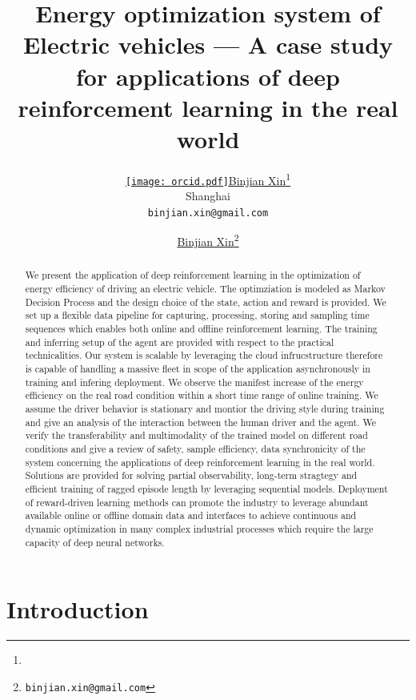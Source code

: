 \documentclass{article}
\title{Energy optimization system of Electric vehicles --- A case study for applications of deep reinforcement learning in the real world}
\author{ \href{https://orcid.org/0009-0003-0705-2612}{\texttt{[image: orcid.pdf]}\hspace{1mm}Binjian Xin}\thanks{} \\
	Shanghai\\
	\texttt{binjian.xin@gmail.com} \\
}
\author[1]{%
	\href{https://orcid.org/0009-0003-0705-2612}{\usebox{\orcid}\hspace{1mm}Binjian Xin\thanks{\texttt{binjian.xin@gmail.com}}}%
}
\affil[1]{}
\begin{document}
\maketitle

\begin{abstract}
	We present the application of deep reinforcement learning in the optimization of energy efficiency of driving an electric vehicle. The optimziation is modeled as Markov Decision Process and the design choice of the state, action and reward is provided. We set up a flexible data pipeline for capturing, processing, storing and sampling time sequences which enables both online and offline reinforcement learning. The training and inferring setup of the agent are provided with respect to the practical technicalities. Our system is scalable by leveraging the cloud infrucstructure therefore is capable of handling a massive fleet in scope of the application asynchronously in training and infering deployment. We observe the manifest increase of the energy efficiency on the real road condition within a short time range of online training. We assume the driver behavior is stationary and montior the driving style during training and give an analysis of the interaction between the human driver and the agent. We verify the transferability and multimodality of the trained model on different road conditions and give a review of safety, sample efficiency, data synchronicity of the system concerning the applications of deep reinforcement learning in the real world. Solutions are provided for solving partial observability, long-term stragtegy and efficient training of ragged episode length by leveraging sequential models. Deployment of reward-driven learning methods can promote the industry to leverage abundant available online or offline domain data and interfaces to achieve continuous and dynamic optimization in many complex industrial processes which require the large capacity of deep neural networks.
\end{abstract}


\section{Introduction}\label{sec:intro}
\end{document}

